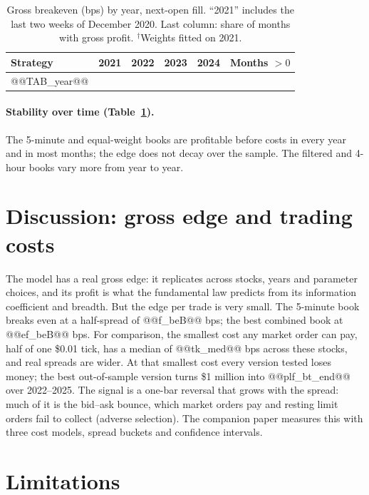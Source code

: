 \documentclass[11pt,a4paper]{article}
\begin{document}
\begin{table}[htbp]
\centering
\caption{Gross breakeven (bps) by year, next-open fill. ``2021'' includes the last two weeks of December
2020. Last column: share of months with gross profit. $^{\dagger}$Weights fitted on 2021.}
\label{tab:year}
\small
\begin{tabular}{@{}lrrrrr@{}}
\toprule
Strategy & 2021 & 2022 & 2023 & 2024 & Months $>0$ \\
\midrule
@@TAB_year@@
\bottomrule
\end{tabular}
\end{table}

\paragraph{Stability over time (Table~\ref{tab:year}).} The 5-minute and equal-weight books are profitable
before costs in every year and in most months; the edge does not decay over the sample. The filtered and
4-hour books vary more from year to year.

\section{Discussion: gross edge and trading costs}
\label{sec:discussion}

The model has a real gross edge: it replicates across stocks, years and parameter choices, and its
profit is what the fundamental law predicts from its information coefficient and breadth. But the edge
per trade is very small. The 5-minute book breaks even at a half-spread of @@f_beB@@ bps; the best combined
book at @@ef_beB@@ bps. For comparison, the smallest cost any market order can pay, half of one \$0.01
tick, has a median of @@tk_med@@ bps across these stocks, and real spreads are wider. At that smallest
cost every version tested loses money; the best out-of-sample version turns \$1 million into
@@plf_bt_end@@ over 2022--2025. The signal is a one-bar reversal that grows with the spread: much of it is
the bid--ask bounce, which market orders pay and resting limit orders fail to collect (adverse selection).
The companion paper measures this with three cost models, spread buckets and confidence intervals.

\section{Limitations}
\label{sec:limits}
\end{document}
